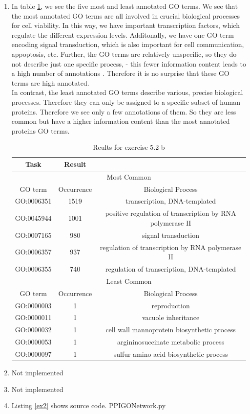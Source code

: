 \documentclass[10pt,a4paper]{article}
\begin{document}
\begin{enumerate}
\item In table \ref{table:ex2c}, we see the five most and least annotated GO terms. We see that the most annotated GO terms are all involved in crucial biological processes for cell viability. In this way, we have important transcription factors, which regulate the different expression levels. Additonally, we have one GO term encoding signal transduction, which is also important for cell communication, appoptosis, etc. Further, the GO terms are relatively unspecific, so they do not describe just one specific process, - this fewer information content leads to a high number of annotations . Therefore it is no surprise that these GO terms are high annotated.\\
In contrast, the least annotated GO terms describe various, precise biological processes. Therefore they can only be assigned to a specific subset of human proteins. Therefore we see only a few annotations of them. So they are less common but have a higher information content than the most annotated proteins GO terms.
\begin{table}[!h]
\caption{Reults for exercise 5.2 b}
\label{table:ex2c}
\begin{tabular}{c c c}
Task & Result\\
\hline
\multicolumn{3}{c}{Most Common}\\
\hline
GO term & Occurrence & Biological Process\\
\hline
GO:0006351 & 1519 &  transcription, DNA-templated\\
GO:0045944 & 1001 &  positive regulation of transcription by RNA polymerase II\\
GO:0007165 & 980 & signal transduction\\
GO:0006357 & 937 &  regulation of transcription by RNA polymerase II\\
GO:0006355 & 740 & regulation of transcription, DNA-templated\\
\hline
\multicolumn{3}{c}{Least Common}\\
\hline
GO term & Occurrence & Biological Process\\
\hline
GO:0000003 & 1 &  reproduction \\
GO:0000011 & 1 & vacuole inheritance\\
GO:0000032 & 1 & cell wall mannoprotein biosynthetic process\\
GO:0000053 & 1 &  argininosuccinate metabolic process \\
GO:0000097 & 1 & sulfur amino acid biosynthetic process\\

\end{tabular}
\end{table}
\item Not implemented

\item Not implemented

\item Listing \ref{ex2} shows source code.
 {PPIGONetwork.py}

\end{enumerate}
\end{document}
